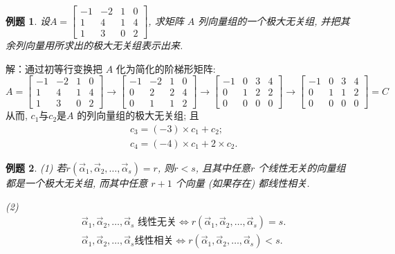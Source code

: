\documentclass[a4paper]{book}
\newtheorem{eg}{例题}[chapter]
\begin{document}
\begin{eg}
设$A=\begin{bmatrix}-1&-2&1&0\\1&4&1&4\\1&3&0&2\end{bmatrix}$, 求矩阵 $A$ 列向量组的一个极大无关组, 并把其余列向量用所求出的极大无关组表示出来.
\end{eg}
解：通过初等行变换把 $A$ 化为简化的阶梯形矩阵:
\begin{displaymath}
A=\begin{bmatrix}-1&-2&1&0\\1&4&1&4\\1&3&0&2\end{bmatrix}\rightarrow
\begin{bmatrix}-1&-2&1&0\\ 0&2&2&4\\0&1&1&2\end{bmatrix}\rightarrow
\begin{bmatrix}-1&0&3&4\\0&1&2&2\\0&0&0&0\end{bmatrix}\rightarrow
\begin{bmatrix}-1&0&3&4\\0&1&1&2\\0&0&0&0\end{bmatrix}=C\end{displaymath}
从而, $c_1$与$c_2$是$A$ 的列向量组的极大无关组; 且
\begin{displaymath}\begin{aligned}
&c_3=(-3)\times c_1+c_2;\\
&c_4=(-4)\times c_1+2\times c_2.\end{aligned}\end{displaymath}

\begin{eg}
(1) 若$r(\vec{\alpha}_1,\vec{\alpha}_2,\dots, \vec{\alpha}_s)=r$, 则$r<s$, 且其中任意$r$ 个线性无关的向量组都是一个极大无关组, 而其中任意 $r +1$ 个向量 (如果存在) 都线性相关.

(2) \begin{displaymath}
\begin{aligned}&\vec{\alpha}_1,\vec{\alpha}_2,\dots, \vec{\alpha}_s \mbox{ 线性无关}\Leftrightarrow r(\vec{\alpha}_1,\vec{\alpha}_2,\dots, \vec{\alpha}_s)=s. \\
&\vec{\alpha}_1,\vec{\alpha}_2,\dots, \vec{\alpha}_s\mbox{线性相关}\Leftrightarrow r(\vec{\alpha}_1,\vec{\alpha}_2,\dots, \vec{\alpha}_s)<s.\end{aligned}\end{displaymath}
\end{eg}
\end{document}
